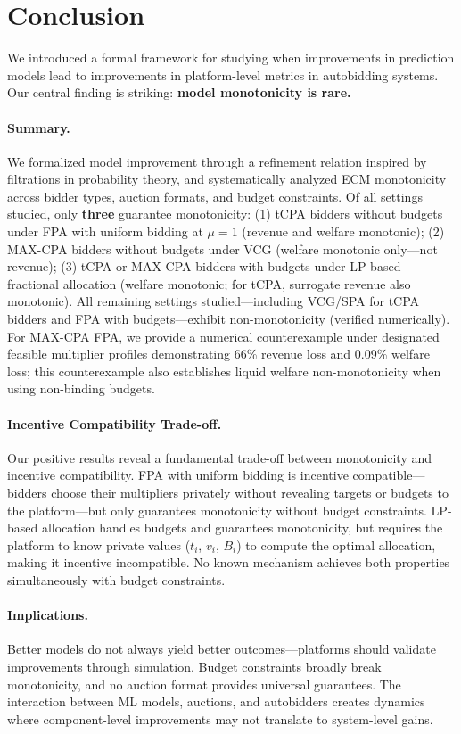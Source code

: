 
\section{Conclusion}
\label{sec:conclusion}

We introduced a formal framework for studying when improvements in prediction models lead to improvements in platform-level metrics in autobidding systems. Our central finding is striking: \textbf{model monotonicity is rare.}

\paragraph{Summary.} We formalized model improvement through a refinement relation inspired by filtrations in probability theory, and systematically analyzed ECM monotonicity across bidder types, auction formats, and budget constraints. Of all settings studied, only \textbf{three} guarantee monotonicity: (1) tCPA bidders without budgets under FPA with uniform bidding at $\mu = 1$ (revenue and welfare monotonic); (2) MAX-CPA bidders without budgets under VCG (welfare monotonic only---not revenue); (3) tCPA or MAX-CPA bidders with budgets under LP-based fractional allocation (welfare monotonic; for tCPA, surrogate revenue also monotonic).
All remaining settings studied---including VCG/SPA for tCPA bidders and FPA with budgets---exhibit non-monotonicity (verified numerically). For MAX-CPA FPA, we provide a numerical counterexample under designated feasible multiplier profiles demonstrating 66\% revenue loss and 0.09\% welfare loss; this counterexample also establishes liquid welfare non-monotonicity when using non-binding budgets.

\paragraph{Incentive Compatibility Trade-off.} Our positive results reveal a fundamental trade-off between monotonicity and incentive compatibility. FPA with uniform bidding is incentive compatible---bidders choose their multipliers privately without revealing targets or budgets to the platform---but only guarantees monotonicity without budget constraints. LP-based allocation handles budgets and guarantees monotonicity, but requires the platform to know private values ($t_i$, $v_i$, $B_i$) to compute the optimal allocation, making it incentive incompatible. No known mechanism achieves both properties simultaneously with budget constraints.

\paragraph{Implications.} Better models do not always yield better outcomes---platforms should validate improvements through simulation. Budget constraints broadly break monotonicity, and no auction format provides universal guarantees. The interaction between ML models, auctions, and autobidders creates dynamics where component-level improvements may not translate to system-level gains.
